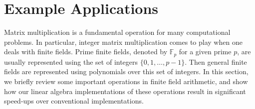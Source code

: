 \documentclass[acmtoms]{acmsmall}
\def\F{\mathbb{F}}
\begin{document}
\begin{table}[ht]
	\renewcommand{\arraystretch}{1.4}
\end{table}






\section{Example Applications}
\label{sec:exapp}

Matrix multiplication is a fundamental operation for many computational problems. In particular, 
integer matrix multiplication comes to play when one deals with finite fields. Prime finite fields, 
denoted by $\F_p$ for a given prime $p$, are usually represented using the set of integers $\{0, 1, 
\dots, p - 1 \}$. Then general finite fields are represented using polynomials over this set of 
integers. In this section, we briefly review some important operations in finite field arithmetic, 
and show how our linear algebra implementations of these operations result in significant speed-ups 
over conventional implementations.
\end{document}
